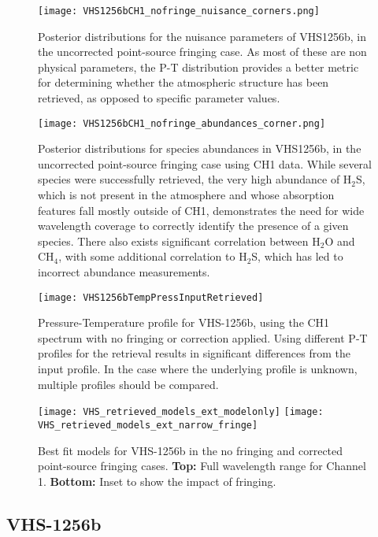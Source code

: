 \begin{figure}[h]
	\centering
	\texttt{[image: VHS1256bCH1\_nofringe\_nuisance\_corners.png]}
	\caption{Posterior distributions for the nuisance parameters of VHS1256b, in the uncorrected point-source fringing case. As most of these are non physical parameters, the P-T distribution provides a better metric for determining whether the atmospheric structure has been retrieved, as opposed to specific parameter values. }
	\label{fig:postVHS_nuisance}
\end{figure}
\begin{figure}[h]
	\centering
	\texttt{[image: VHS1256bCH1\_nofringe\_abundances\_corner.png]}
	\caption{Posterior distributions for species abundances in VHS1256b, in the uncorrected point-source fringing case using CH1 data. While several species were successfully retrieved, the very high abundance of H$_{2}$S, which is not present in the atmosphere and whose absorption features fall mostly outside of CH1, demonstrates the need for wide wavelength coverage to correctly identify the presence of a given species. There also exists significant correlation between H$_{2}$O and CH$_{4}$, with some additional correlation to H$_{2}$S, which has led to incorrect abundance measurements.}
	\label{fig:postVHS_abundances}
\end{figure}
\begin{figure}[h]
	\centering
	\texttt{[image: VHS1256bTempPressInputRetrieved]}
	\caption{Pressure-Temperature profile for VHS-1256b, using the CH1 spectrum with no fringing or correction applied. Using different P-T profiles for the retrieval results in significant differences from the input profile. In the case where the underlying profile is unknown, multiple profiles should be compared.}
	\label{fig:presVHS}
\end{figure}
\begin{figure}[h]
	\centering
	\texttt{[image: VHS\_retrieved\_models\_ext\_modelonly]}
	\texttt{[image: VHS\_retrieved\_models\_ext\_narrow\_fringe]}
	\caption{Best fit models for VHS-1256b in the no fringing and corrected point-source fringing cases. \textbf{Top:} Full wavelength range for Channel 1. \textbf{Bottom:} Inset to show the impact of fringing.}
	\label{fig:bestfitVHS}
\end{figure}

\subsection{VHS-1256b}

